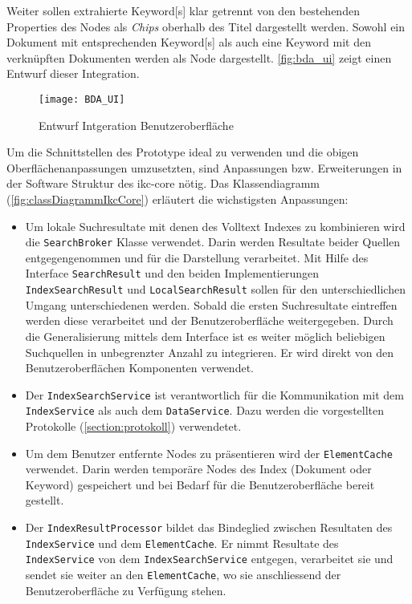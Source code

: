 Weiter sollen extrahierte \gls{Keyword}[s] klar getrennt von den bestehenden Properties des Nodes als \textit{Chips} oberhalb des Titel dargestellt werden. Sowohl ein Dokument mit entsprechenden \gls{Keyword}[s] als auch eine \gls{Keyword} mit den verknüpften Dokumenten werden als Node dargestellt. \autoref{fig:bda_ui} zeigt einen Entwurf dieser Integration. 

    \begin{figure}[H]
    \centering
    \texttt{[image: BDA\_UI]}
    \caption{Entwurf Intgeration Benutzeroberfläche}
    \label{fig:bda_ui}
    \end{figure}

Um die Schnittstellen des Prototype ideal zu verwenden und die obigen Oberflächenanpassungen umzusetzten, sind Anpassungen bzw. Erweiterungen in der Software Struktur des \gls{ikc-core} nötig. Das Klassendiagramm (\autoref{fig:classDiagrammIkcCore}) erläutert die wichstigsten Anpassungen:

\begin{itemize}
    \item Um lokale Suchresultate mit denen des Volltext Indexes zu kombinieren wird die \texttt{SearchBroker} Klasse verwendet. Darin werden Resultate beider Quellen entgegengenommen und für die Darstellung verarbeitet. Mit Hilfe des Interface \texttt{SearchResult} und den beiden Implementierungen \texttt{IndexSearchResult} und \texttt{LocalSearchResult} sollen für den unterschiedlichen Umgang unterschiedenen werden. Sobald die ersten Suchresultate eintreffen werden diese verarbeitet und der Benutzeroberfläche weitergegeben. Durch die Generalisierung mittels dem Interface ist es weiter möglich beliebigen Suchquellen in unbegrenzter Anzahl zu integrieren. Er wird direkt von den Benutzeroberflächen Komponenten verwendet. 
    \item Der \texttt{IndexSearchService} ist verantwortlich für die Kommunikation mit dem \texttt{IndexService} als auch dem \texttt{DataService}. Dazu werden die vorgestellten Protokolle (\autoref{section:protokoll}) verwendetet.
    \item Um  dem Benutzer entfernte Nodes zu präsentieren wird der \texttt{ElementCache} verwendet. Darin werden temporäre Nodes des Index (Dokument oder \gls{Keyword}) gespeichert und bei Bedarf für die Benutzeroberfläche bereit gestellt.
    \item Der \texttt{IndexResultProcessor} bildet das Bindeglied zwischen Resultaten des \texttt{IndexService} und dem \texttt{ElementCache}. Er nimmt Resultate des \texttt{IndexService} von dem \texttt{IndexSearchService} entgegen, verarbeitet sie und sendet sie weiter an den \texttt{ElementCache}, wo sie anschliessend der Benutzeroberfläche zu Verfügung stehen.

\end{itemize}


